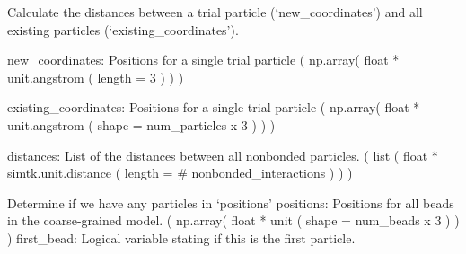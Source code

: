 \documentclass[letterpaper,12pt,english,openany,oneside]{sphinxmanual}
\begin{document}

\begin{fulllineitems}
\label{\detokenize{utilities:utilities.util.distances}}
Calculate the distances between a trial particle (‘new\_coordinates’)
and all existing particles (‘existing\_coordinates’).

new\_coordinates: Positions for a single trial particle
( np.array( float * unit.angstrom ( length = 3 ) ) )

existing\_coordinates: Positions for a single trial particle
( np.array( float * unit.angstrom ( shape = num\_particles x 3 ) ) )

distances: List of the distances between all nonbonded particles.
( list ( float * simtk.unit.distance ( length = \# nonbonded\_interactions ) ) )

\end{fulllineitems}


\begin{fulllineitems}
\label{\detokenize{utilities:utilities.util.first_bead}}
Determine if we have any particles in ‘positions’
positions: Positions for all beads in the coarse-grained model.
( np.array( float * unit ( shape = num\_beads x 3 ) ) )
first\_bead: Logical variable stating if this is the first particle.

\end{fulllineitems}

\end{document}
